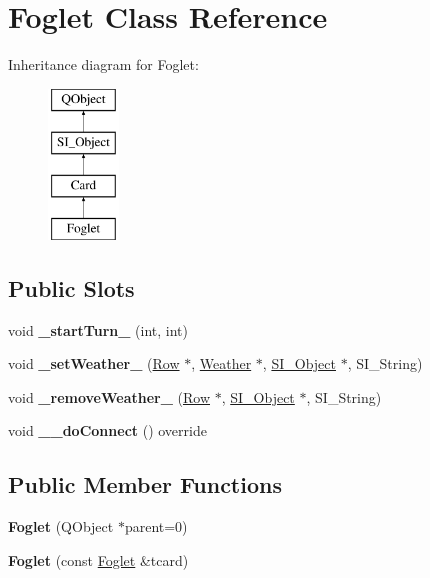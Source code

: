 \hypertarget{class_foglet}{}\section{Foglet Class Reference}
\label{class_foglet}
Inheritance diagram for Foglet\+:\begin{figure}[H]
\begin{center}
\leavevmode
\includegraphics[height=4.000000cm]{class_foglet}
\end{center}
\end{figure}
\subsection*{Public Slots}
\begin{DoxyCompactItemize}
\item 
\mbox{\label{class_foglet_a64b538f5ba258c2652c87952d646fce8}} 
void {\bfseries \+\_\+start\+Turn\+\_\+} (int, int)
\item 
\mbox{\label{class_foglet_a8ecd062b0341b782f51dd9143fbb27b7}} 
void {\bfseries \+\_\+set\+Weather\+\_\+} (\hyperlink{class_card_set}{Row} $\ast$, \hyperlink{class_weather}{Weather} $\ast$, \hyperlink{class_s_i___object}{S\+I\+\_\+\+Object} $\ast$, S\+I\+\_\+\+String)
\item 
\mbox{\label{class_foglet_aeddf94bfea21356a6068353353497d3e}} 
void {\bfseries \+\_\+remove\+Weather\+\_\+} (\hyperlink{class_card_set}{Row} $\ast$, \hyperlink{class_s_i___object}{S\+I\+\_\+\+Object} $\ast$, S\+I\+\_\+\+String)
\item 
\mbox{\label{class_foglet_a8df31e9b16661b767169aff26609fda5}} 
void {\bfseries \+\_\+\+\_\+do\+Connect} () override
\end{DoxyCompactItemize}
\subsection*{Public Member Functions}
\begin{DoxyCompactItemize}
\item 
\mbox{\label{class_foglet_a4774284370a51b469df6681deaf3793c}} 
{\bfseries Foglet} (Q\+Object $\ast$parent=0)
\item 
\mbox{\label{class_foglet_aedc4ae41d07b9d40100152c4aaa3d212}} 
{\bfseries Foglet} (const \hyperlink{class_foglet}{Foglet} \&tcard)
\end{DoxyCompactItemize}
